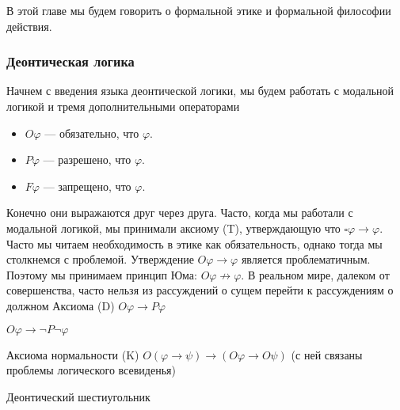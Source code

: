\documentclass[openany]{book}
\theoremstyle{plain}
\theoremstyle{definition}
\begin{document}
В этой главе мы будем говорить о формальной этике и формальной философии действия.

\subsubsection{Деонтическая логика}

Начнем с введения языка деонтической логики, мы будем работать с модальной логикой и тремя дополнительными операторами 
\begin{itemize}
\item \(O \varphi\) --- обязательно, что \(\varphi\).
\item \(P \varphi\) --- разрешено, что \(\varphi\).
\item \(F \varphi\) --- запрещено, что \(\varphi\).
\end{itemize}

Конечно они выражаются друг через друга.
Часто, когда мы работали с модальной логикой, мы принимали аксиому (T), утверждающую что $\square \varphi \to \varphi$. Часто мы читаем необходимость в этике как обязательность, однако тогда мы столкнемся с проблемой. Утверждение \(O \varphi \to \varphi\) является проблематичным. Поэтому мы принимаем принцип Юма: \(O \varphi \not\to \varphi\). В реальном мире, далеком от совершенства, часто нельзя из рассуждений о сущем перейти к рассуждениям о должном
Аксиома (D) \(O \varphi \to P \varphi\)


\(O \varphi \to \neg P \neg \varphi\)


Аксиома нормальности (K) \(O(\varphi \to \psi) \to (O \varphi \to O \psi) \) (с ней связаны проблемы логического всевиденья)

Деонтический шестиугольник
\end{document}
